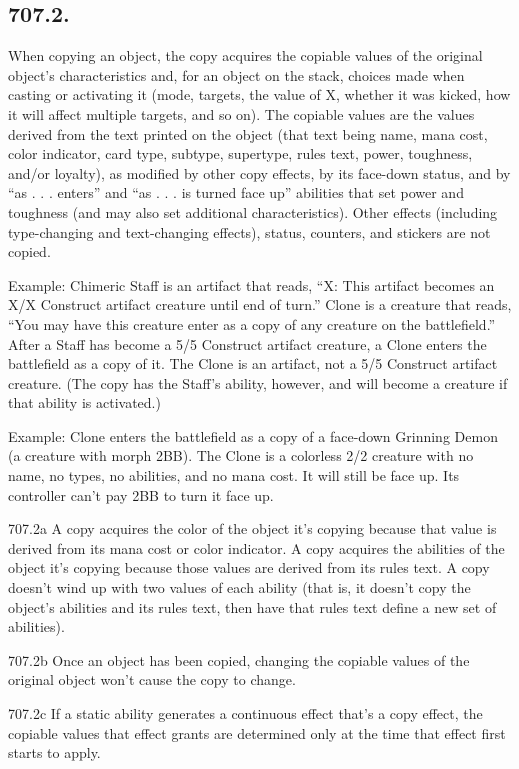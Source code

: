 \subsection*{707.2.}
When copying an object, the copy acquires the copiable values of the original object’s characteristics and, for an object on the stack, choices made when casting or activating it (mode, targets, the value of X, whether it was kicked, how it will affect multiple targets, and so on). The copiable values are the values derived from the text printed on the object (that text being name, mana cost, color indicator, card type, subtype, supertype, rules text, power, toughness, and/or loyalty), as modified by other copy effects, by its face-down status, and by “as . . . enters” and “as . . . is turned face up” abilities that set power and toughness (and may also set additional characteristics). Other effects (including type-changing and text-changing effects), status, counters, and stickers are not copied.

Example: Chimeric Staff is an artifact that reads, “{X}: This artifact becomes an X/X Construct artifact creature until end of turn.” Clone is a creature that reads, “You may have this creature enter as a copy of any creature on the battlefield.” After a Staff has become a 5/5 Construct artifact creature, a Clone enters the battlefield as a copy of it. The Clone is an artifact, not a 5/5 Construct artifact creature. (The copy has the Staff’s ability, however, and will become a creature if that ability is activated.)

Example: Clone enters the battlefield as a copy of a face-down Grinning Demon (a creature with morph {2}{B}{B}). The Clone is a colorless 2/2 creature with no name, no types, no abilities, and no mana cost. It will still be face up. Its controller can’t pay {2}{B}{B} to turn it face up.

707.2a A copy acquires the color of the object it’s copying because that value is derived from its mana cost or color indicator. A copy acquires the abilities of the object it’s copying because those values are derived from its rules text. A copy doesn’t wind up with two values of each ability (that is, it doesn’t copy the object’s abilities and its rules text, then have that rules text define a new set of abilities).

707.2b Once an object has been copied, changing the copiable values of the original object won’t cause the copy to change.

707.2c If a static ability generates a continuous effect that’s a copy effect, the copiable values that effect grants are determined only at the time that effect first starts to apply.

